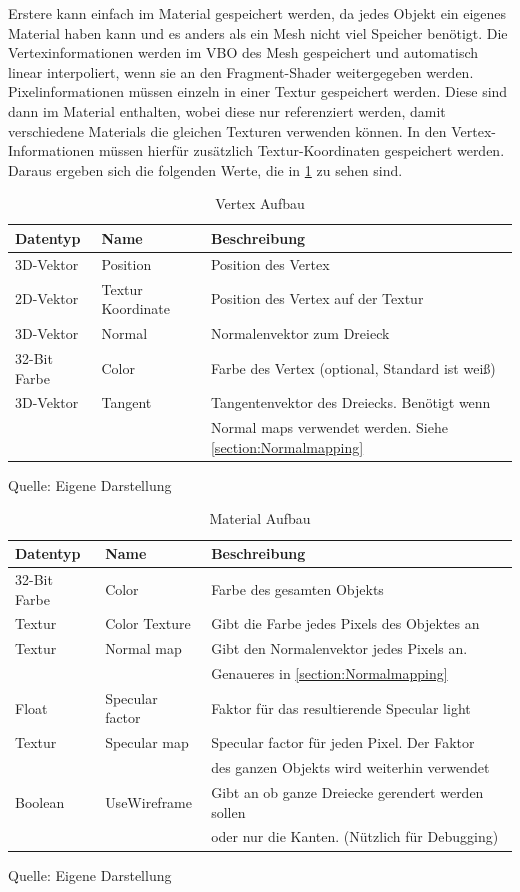 Erstere kann einfach im Material gespeichert werden, da jedes Objekt ein eigenes Material haben kann und es anders als ein Mesh nicht viel Speicher benötigt. Die Vertexinformationen werden im \ac{VBO} des Mesh gespeichert und automatisch linear interpoliert, wenn sie an den Fragment-Shader weitergegeben werden. Pixelinformationen müssen einzeln in einer Textur gespeichert werden. Diese sind dann im Material enthalten, wobei diese nur referenziert werden, damit verschiedene Materials die gleichen Texturen verwenden können. In den Vertex-Informationen müssen hierfür zusätzlich Textur-Koordinaten gespeichert werden. Daraus ergeben sich die folgenden Werte, die in \cref{table:VertexAufbau} zu sehen sind.

\begin{table}[h]
	\caption{Vertex Aufbau}
	\label{table:VertexAufbau}
	\centering
	\begin{tabular}{lll}\toprule[1.5pt]
		Datentyp & Name & Beschreibung \\\midrule
		3D-Vektor & Position & Position des Vertex \\
		2D-Vektor & Textur Koordinate & Position des Vertex auf der Textur \\
		3D-Vektor & Normal & Normalenvektor zum Dreieck \\
		32-Bit Farbe & Color & Farbe des Vertex (optional, Standard ist weiß) \\
		3D-Vektor & Tangent & Tangentenvektor des Dreiecks. Benötigt wenn \\
		 & & Normal maps verwendet werden. Siehe \cref{section:Normalmapping}\\\bottomrule[1.5pt]
	\end{tabular}
	Quelle: Eigene Darstellung
\end{table}
\begin{table}[h]
	\caption{Material Aufbau}
	\centering
	\begin{tabular}{lll}\toprule[1.5pt]
	Datentyp & Name & Beschreibung \\\midrule
	32-Bit Farbe & Color & Farbe des gesamten Objekts \\
	Textur & Color Texture & Gibt die Farbe jedes Pixels des Objektes an \\
	Textur & Normal map & Gibt den Normalenvektor jedes Pixels an. \\
	 & & Genaueres in \cref{section:Normalmapping} \\
	Float & Specular factor & Faktor für das resultierende Specular light \\
	Textur & Specular map & Specular factor für jeden Pixel. Der Faktor \\
	 & & des ganzen Objekts wird weiterhin verwendet \\
	 Boolean & UseWireframe & Gibt an ob ganze Dreiecke gerendert werden sollen\\
	  & & oder nur die Kanten. (Nützlich für Debugging)\\\bottomrule[1.5pt]
\end{tabular}
	Quelle: Eigene Darstellung
\end{table}

